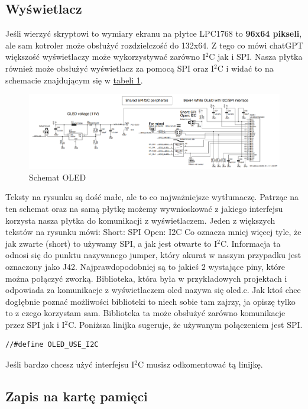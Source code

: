 \documentclass[11pt]{article}
\begin{document}
\subsection{Wyświetlacz}
Jeśli wierzyć skryptowi to wymiary ekranu na płytce LPC1768 to \textbf{96x64 pikseli},
ale sam kotroler może obsłużyć rozdzielczość do 132x64. Z tego co mówi chatGPT 
większość wyświetlaczy może wykorzystywać zarówno I$^2$C jak i SPI. Nasza płytka 
również może obsłużyć wyświetlacz za pomocą SPI oraz I$^2$C i widać to na schemacie znajdującym
się w \hyperref[tab:tab1]{tabeli 1}.
\begin{figure}[H]
    \includegraphics[width=\textwidth]{OLED.png}
    \caption{Schemat OLED}
\end{figure}
Teksty na rysunku są dość małe, ale to co najważniejsze wytłumaczę. Patrząc na ten
schemat oraz na samą płytkę możemy wywnioskować z jakiego interfejsu korzysta nasza 
płytka do komunikacji z wyświetlaczem. Jeden z większych tekstów na rysunku mówi:\newline
Short: SPI \newline
Open: I2C \newline
Co oznacza mniej więcej tyle, że jak zwarte (short) to używamy SPI, a jak jest 
otwarte to I$^2$C. Informacja ta odnosi się do punktu nazywanego jumper, który 
akurat w naszym przypadku jest oznaczony jako J42. Najprawdopodobniej są to jakieś 2
wystające piny, które można połączyć zworką.
Biblioteka, która była w przykładowych projektach i odpowiada za komunikacje z 
wyświetlaczem oled nazywa się oled.c. Jak ktoś chce dogłębnie poznać możliwości
biblioteki to niech sobie tam zajrzy, ja opiszę tylko to z czego korzystam sam.
Biblioteka ta może obsłużyć zarówno komunikacje przez SPI jak i I$^2$C. \newline
Poniższa linijka sugeruje, że używanym połączeniem jest SPI.
\begin{lstlisting}
//#define OLED_USE_I2C
\end{lstlisting}
Jeśli bardzo chcesz użyć interfejsu I$^2$C musisz odkomentować tą linijkę.
\subsection{Zapis na kartę pamięci}
\end{document}
